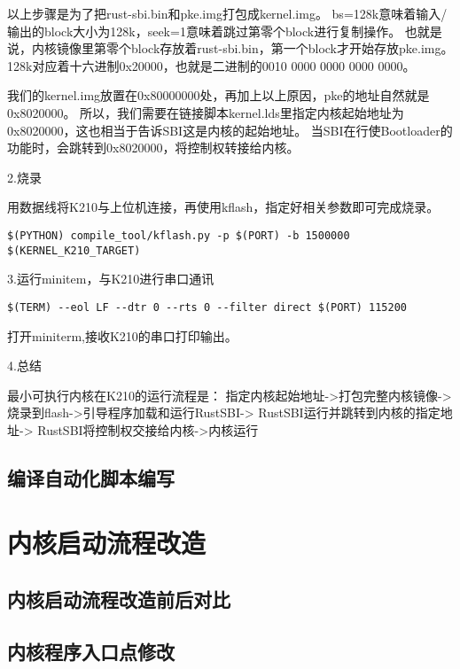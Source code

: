 以上步骤是为了把rust-sbi.bin和pke.img打包成kernel.img。
bs=128k意味着输入/输出的block大小为128k，seek=1意味着跳过第零个block进行复制操作。
也就是说，内核镜像里第零个block存放着rust-sbi.bin，第一个block才开始存放pke.img。
128k对应着十六进制0x20000，也就是二进制的0010 0000 0000 0000 0000。

我们的kernel.img放置在0x80000000处，再加上以上原因，pke的地址自然就是0x8020000。
所以，我们需要在链接脚本kernel.lds里指定内核起始地址为0x8020000，这也相当于告诉SBI这是内核的起始地址。
当SBI在行使Bootloader的功能时，会跳转到0x8020000，将控制权转接给内核。

2.烧录

用数据线将K210与上位机连接，再使用kflash，指定好相关参数即可完成烧录。

\begin{lstlisting}[caption={烧录}, label={lst:burn}]
    $(PYTHON) compile_tool/kflash.py -p $(PORT) -b 1500000 $(KERNEL_K210_TARGET)
\end{lstlisting}

3.运行minitem，与K210进行串口通讯

\begin{lstlisting}[caption={运行minitem}, label={lst:run_minitem}]
    $(TERM) --eol LF --dtr 0 --rts 0 --filter direct $(PORT) 115200
\end{lstlisting}

打开miniterm,接收K210的串口打印输出。

4.总结

最小可执行内核在K210的运行流程是：
指定内核起始地址->打包完整内核镜像->
烧录到flash->引导程序加载和运行RustSBI->
RustSBI运行并跳转到内核的指定地址->
RustSBI将控制权交接给内核->内核运行

\subsection{编译自动化脚本编写}

\section{内核启动流程改造}

\subsection{内核启动流程改造前后对比}

\subsection{内核程序入口点修改}

